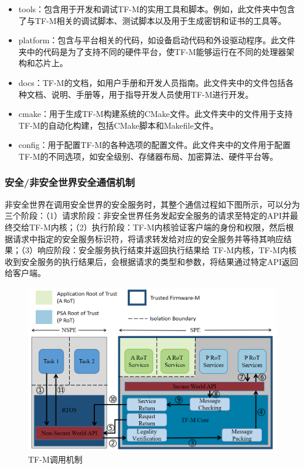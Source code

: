 \documentclass[12pt,a4paper]{ctexart}
\begin{document}
\begin{itemize}
    \item tools：包含用于开发和调试TF-M的实用工具和脚本。例如，此文件夹中包含了与TF-M相关的调试脚本、测试脚本以及用于生成密钥和证书的工具等。
    \item platform：包含与平台相关的代码，如设备启动代码和外设驱动程序。此文件夹中的代码是为了支持不同的硬件平台，使TF-M能够运行在不同的处理器架构和芯片上。
    \item docs：TF-M的文档，如用户手册和开发人员指南。此文件夹中的文件包括各种文档、说明、手册等，用于指导开发人员使用TF-M进行开发。
    \item cmake：用于生成TF-M构建系统的CMake文件。此文件夹中的文件用于支持TF-M的自动化构建，包括CMake脚本和Makefile文件。
    \item config：用于配置TF-M的各种选项的配置文件。此文件夹中的文件用于配置TF-M的不同选项，如安全级别、存储器布局、加密算法、硬件平台等。
\end{itemize}

\subsubsection{安全/非安全世界安全通信机制}
非安全世界在调用安全世界的安全服务时，其整个通信过程如下图所示，可以分为三个阶段：（1）请求阶段：非安全世界任务发起安全服务的请求至特定的API并最终交给TF-M内核；（2）执行阶段：TF-M内核验证客户端的身份和权限，然后根据请求中指定的安全服务标识符，将请求转发给对应的安全服务并等待其响应结果；（3）响应阶段：安全服务执行结束并返回执行结果给 TF-M内核，TF-M内核收到安全服务的执行结果后，会根据请求的类型和参数，将结果通过特定API返回给客户端。
\begin{figure}
    \centering
    \includegraphics[scale=0.27]{graph/TF-M Secure communication processes.png}
    \caption{TF-M调用机制}
\end{figure}
\end{document}
